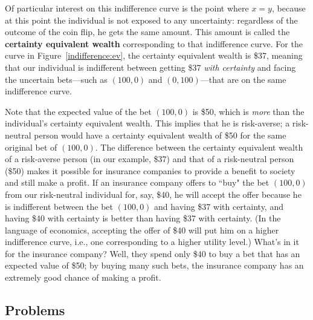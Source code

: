 \begin{CALCULUS}
Of particular interest on this indifference curve is the point where $x=y$, because at this point the individual is not exposed to any uncertainty: regardless of the outcome of the coin flip, he gets the same amount. This amount is called the \textbf{certainty equivalent wealth} corresponding to that indifference curve. For the curve in Figure~\ref{indifference:ev}, the certainty equivalent wealth is \$37, meaning that our individual is indifferent between getting \$37 \emph{with certainty} and facing the uncertain bets---such as $(100,0)$ and $(0,100)$---that are on the same indifference curve.

Note that the expected value of the bet $(100,0)$ is \$50, which is \emph{more} than the individual's certainty equivalent wealth. This implies that he is risk-averse; a risk-neutral person would have a certainty equivalent wealth of \$50 for the same original bet of $(100,0)$. The difference between the certainty equivalent wealth of a risk-averse person (in our example, \$37) and that of a risk-neutral person (\$50) makes it possible for insurance companies to provide a benefit to society and still make a profit. If an insurance company offers to ``buy" the bet $(100,0)$ from our risk-neutral individual for, say, \$40, he will accept the offer because he is indifferent between the bet $(100,0)$ and having \$37 with certainty, and having \$40 with certainty is better than having \$37 with certainty. (In the language of economics, accepting the offer of \$40 will put him on a higher indifference curve, i.e., one corresponding to a higher utility level.) What's in it for the insurance company? Well, they spend only \$40 to buy a bet that has an expected value of \$50; by buying many such bets, the insurance company has an extremely good chance of making a profit.




\end{CALCULUS}


\begin{EXAM}
\section*{Problems}


\end{EXAM}

